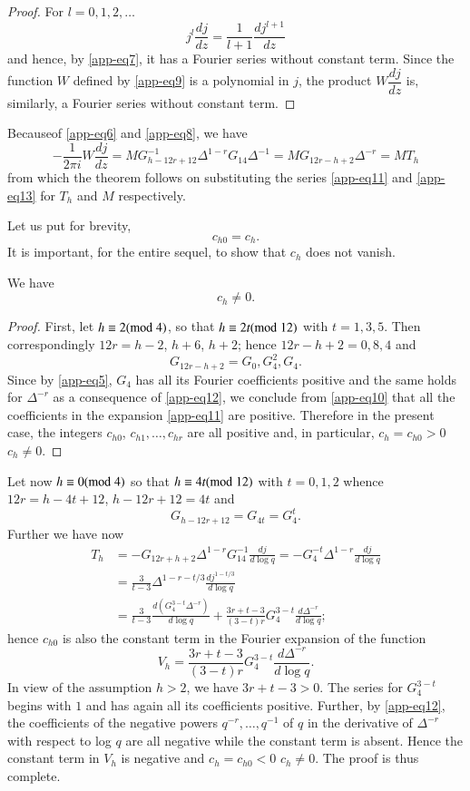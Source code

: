 \begin{proof}
For $l=0,1,2,\ldots$
$$
j^{l}\frac{dj}{dz}=\frac{1}{l+1}\frac{dj^{l+1}}{dz}
$$
and hence, by \eqref{app-eq7}, it has a Fourier series without
constant term. Since the function $W$ defined by \eqref{app-eq9} is a
polynomial in $j$, the product $W\dfrac{dj}{dz}$ is, similarly, a
Fourier series without constant term.
\end{proof}

Because\pageoriginale of \eqref{app-eq6} and \eqref{app-eq8}, we have
$$
-\frac{1}{2\pi
  i}W\frac{dj}{dz}=MG^{-1}_{h-12r+12}\Delta^{1-r}G_{14}\Delta^{-1}=MG_{12r-h+2}\Delta^{-r}=MT_{h} 
$$
from which the theorem follows on substituting the series
\eqref{app-eq11} and \eqref{app-eq13} for $T_{h}$ and $M$
respectively.

Let us put for brevity,
$$
c_{h0}=c_{h}.
$$
It is important, for the entire sequel, to show that $c_{h}$ does not
vanish.

\begin{thm}\label{app-thm2}
We have
$$
c_{h}\neq 0.
$$
\end{thm}

\begin{proof}
First, let $h\equiv 2(\rm{mod} \;  4)$, so that $h\equiv 2t(\rm{mod} \;  12)$ with
$t=1,3,5$. Then correspondingly $12r=h-2$, $h+6$, $h+2$; hence
$12r-h+2=0,8,4$ and
$$
G_{12r-h+2}=G_{0},G^{2}_{4},G_{4}.
$$
Since by \eqref{app-eq5}, $G_{4}$ has all its Fourier coefficients
positive and the same holds for $\Delta^{-r}$ as a consequence of
\eqref{app-eq12}, we conclude from \eqref{app-eq10} that all the
coefficients in the expansion \eqref{app-eq11} are positive. Therefore
in the present case, the integers $c_{h0}$, $c_{h1},\ldots,c_{hr}$ are
all positive and, in particular, $c_{h}=c_{h0}>0$ \ie $c_{h}\neq 0$.
\end{proof}

Let now $h\equiv 0(\rm{mod} \;   4)$ so that $h\equiv 4t(\rm{mod} \;  12)$ with
$t=0,1,2$ whence $12r=h-4t+12$, $h-12r+12=4t$ and
$$
G_{h-12r+12}=G_{4t}=G^{t}_{4}.
$$
Further we have now
\begin{align*}
T_{h} &= -G_{12r+h+2}\Delta^{1-r}G^{-1}_{14}\frac{dj}{d\log
  q}=-G^{-t}_{4}\Delta^{1-r}\frac{dj}{d\log q}\\
&= \frac{3}{t-3}\Delta^{1-r-t/3}\frac{dj^{1-t/3}}{d\log q}\\
&= \frac{3}{t-3}\frac{d(G^{3-t}_{4}\Delta^{-r})}{d\log
  q}+\frac{3r+t-3}{(3-t)r}G^{3-t}_{4}\frac{d\Delta^{-r}}{d\log q};
\end{align*}\pageoriginale
hence $c_{h0}$ is also the constant term in the Fourier expansion of
the function
$$
V_{h}=\frac{3r+t-3}{(3-t)r}G^{3-t}_{4}\frac{d\Delta^{-r}}{d\log q}.
$$
In view of the assumption $h>2$, we have $3r+t-3>0$. The series for
$G^{3-t}_{4}$ begins with $1$ and has again all its coefficients
positive. Further, by \eqref{app-eq12}, the coefficients of the
negative powers $q^{-r},\ldots,q^{-1}$ of $q$ in the derivative of
$\Delta^{-r}$ with respect to log $q$ are all negative while the
constant term is absent. Hence the constant term in $V_{h}$ is
negative and $c_{h}=c_{h0}<0$ \ie $c_{h}\neq 0$. The proof is thus
complete.


